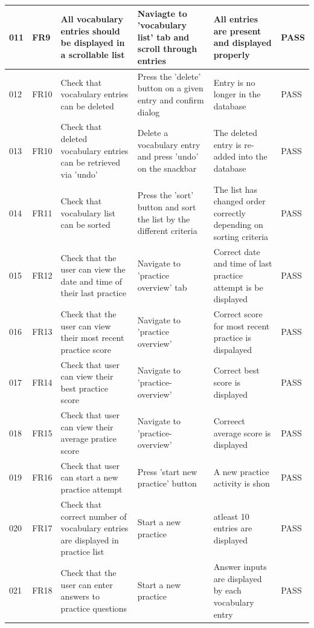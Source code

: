 \documentclass[runningheads]{llncs}
\begin{document}
\begin{subappendices}
		\newpage
		
		\begin{table}
			\begin{tabularx}{\textwidth}{|l|X|X|X|X|l|}
				\hline
				011 & FR9 & All vocabulary entries should be displayed in a scrollable list & Naviagte to 'vocabulary list' tab and scroll through entries & All entries are present and displayed properly & PASS \\
				\hline
				012 & FR10 & Check that vocabulary entries can be deleted & Press the 'delete' button on a given entry and confirm dialog & Entry is no longer in the database & PASS \\
				\hline
				013 & FR10 & Check that deleted vocabulary entries can be retrieved via 'undo' & Delete a vocabulary entry and press 'undo' on the snackbar & The deleted entry is re-added into the database & PASS \\
				\hline
				014 & FR11 & Check that vocabulary list can be sorted & Press the 'sort' button and sort the list by the different criteria & The list has changed order correctly depending on sorting criteria & PASS \\
				\hline
				015 & FR12 & Check that the user can view the date and time of their last practice & Navigate to 'practice overview' tab & Correct date and time of last practice attempt is be displayed & PASS \\
				\hline
				016 & FR13 & Check that the user can view their most recent practice score & Navigate to 'practice overview' & Correct score for most recent practice is dispalayed & PASS \\
				\hline
				017 & FR14 & Check that user can view their best practice score & Navigate to 'practice-overview' & Correct best score is displayed & PASS \\
				\hline
				018 & FR15 & Check that user can view their average pratice score & Navigate to 'practice-overview' & Correect average score is displayed & PASS \\
				\hline
				019 & FR16 & Check that user can start a new practice attempt & Press 'start new practice' button & A new practice activity is shon & PASS \\
				\hline
				020 & FR17 & Check that correct number of vocabulary entries are displayed in practice list & Start a new practice & atleast 10 entries are displayed & PASS \\
				\hline
				021 & FR18 & Check that the user can enter answers to practice questions & Start a new practice & Answer inputs are displayed by each vocabulary entry & PASS \\
				\hline
			\end{tabularx}
		\end{table}
		

\end{subappendices}
\end{document}
